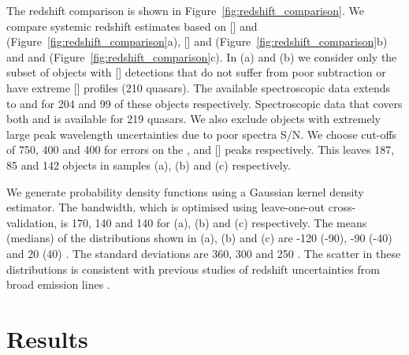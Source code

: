 The redshift comparison is shown in Figure~\ref{fig:redshift_comparison}. 
We compare systemic redshift estimates based on [] and \hb (Figure~\ref{fig:redshift_comparison}a), [] and \ha (Figure~\ref{fig:redshift_comparison}b) and \hb and \ha (Figure~\ref{fig:redshift_comparison}c). 
In (a) and (b) we consider only the subset of objects with [] detections that do not suffer from poor  subtraction or have extreme [] profiles (210 quasars). 
The available spectroscopic data extends to \hb and \ha for 204 and 99 of these objects respectively. 
Spectroscopic data that covers both \hb and \ha is available for 219 quasars. 
We also exclude objects with extremely large peak wavelength uncertainties due to poor spectra S/N. 
We choose cut-offs of 750, 400 and 400 for errors on the \hbns, \ha and [] peaks respectively. 
This leaves 187, 85 and 142 objects in samples (a), (b) and (c) respectively. 

We generate probability density functions using a Gaussian kernel density estimator.
The bandwidth, which is optimised using leave-one-out cross-validation, is 170, 140 and 140 \kms for (a), (b) and (c) respectively. 
The means (medians) of the distributions shown in (a), (b) and (c) are -120 (-90), -90 (-40) and 20 (40) \kms. 
The standard deviations are 360, 300 and 250 \kms. 
The scatter in these distributions is consistent with previous studies of redshift uncertainties from broad emission lines \citep[e.g.][]{shen16b}. 

\section{Results}

